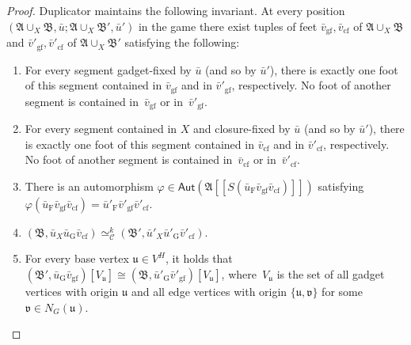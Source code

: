 \documentclass[]{lmcs}
\renewcommand{\phi}{\varphi}
\newcommand{\iso}{\cong}
\newcommand{\set}[1]{\lbrace #1 \rbrace}
\newcommand{\autoA}{\phi}
\newcommand{\autGroup}[1]{\mathsf{Aut}(#1)}
\newcommand{\tup}[1]{\bar{#1}}
\newcommand{\vertA}{u}
\newcommand{\vertB}{v}
\newcommand{\StructA}{\mathfrak{A}}
\newcommand{\StructB}{\mathfrak{B}}
\newcommand{\neighbors}[2]{N_{#1}(#2)}
\newcommand{\bVertA}{\mathfrak{u}}
\newcommand{\bVertB}{\mathfrak{v}}
\newcommand{\footbset}{X}
\newcommand{\footbsetA}{X}
\newcommand{\gluing}[3]{#1 \cup_#2 #3}
\newcommand{\kequiv}[1]{\simeq^#1_{\mathcal{C}}}
\newcommand{\footinduced}[2]{#1[[#2]]}
\newcommand{\segmentOf}[1]{S(#1)}
\newcommand{\feetrestrict}[2]{#1_{#2}}
\newcommand{\gadgetrestrict}[1]{#1_{\text{G}}}
\newcommand{\nongadgetrestrict}[1]{#1_{\text{F}}}
\newcommand{\gadgetfixed}[1]{#1_{\text{gf}}}
\newcommand{\closurefixed}[1]{#1_{\text{cf}}}
\begin{document}
\begin{proof}
	Duplicator maintains the following invariant.
	At every position $(\gluing{\StructA}{\footbset}{\StructB},\tup{\vertA} ; \gluing{\StructA}{\footbset}{\StructB'}, \tup{\vertA}')$ in the game
	there exist tuples of feet $\gadgetfixed{\tup{\vertB}}, \closurefixed{\tup{\vertB}}$
	of $\gluing{\StructA}{\footbset}{\StructB}$
	and $\gadgetfixed{\tup{\vertB}'},\closurefixed{\tup{\vertB}'}$
	of $\gluing{\StructA}{\footbset}{\StructB'}$ satisfying the following:
	\begin{enumerate}
		\item \label{itm:gadget-fixed-vertices}
		For every segment  gadget-fixed by $\tup{\vertA}$
		(and so by $\tup{\vertA}'$),
		there is exactly one foot of this segment contained in $\gadgetfixed{\tup{\vertB}}$ and in $\gadgetfixed{\tup{\vertB}'}$, respectively.
		No foot of another segment is contained in~$\gadgetfixed{\tup{\vertB}}$ or in~$\gadgetfixed{\tup{\vertB}'}$.
		\item \label{itm:closure-fixed-vertices}
		For every segment contained in $\footbsetA$ and closure-fixed by $\tup{\vertA}$ (and so by $\tup{\vertA}'$),
		there is exactly one foot of this segment contained in $\closurefixed{\tup{\vertB}}$ and in $\closurefixed{\tup{\vertB}'}$, respectively.
		No foot of another segment is contained in~$\closurefixed{\tup{\vertB}}$ or in~$\closurefixed{\tup{\vertB}'}$.
		\item \label{itm:inv-multipede} There is an automorphism $\autoA \in \autGroup{\footinduced{\StructA}{\segmentOf{\nongadgetrestrict{\tup{\vertA}}\gadgetfixed{\tup{\vertB}}\closurefixed{\tup{\vertB}}}}}$ satisfying
		$\autoA(\nongadgetrestrict{\tup{\vertA}}\gadgetfixed{\tup{\vertB}}\closurefixed{\tup{\vertB}}) = \nongadgetrestrict{\tup{\vertA}'}\gadgetfixed{\tup{\vertB}'}\closurefixed{\tup{\vertB}'}$.
		\item \label{itm:inv-cfi} $(\StructB, \feetrestrict{\tup{\vertA}}{\footbsetA}\gadgetrestrict{\tup{\vertA}}\closurefixed{\tup{\vertB}}) \kequiv{k} (\StructB', \feetrestrict{\tup{\vertA}'}{\footbsetA}\gadgetrestrict{\tup{\vertA}'}\closurefixed{\tup{\vertB}'})$.
		\item \label{itm:inv-cfi-gadget-fixed} For every base vertex $\bVertA \in V^H$,
		it holds that
		$(\StructB', \gadgetrestrict{\tup{\vertA}}\gadgetfixed{\tup{\vertB}})[V_\bVertA] \iso (\StructB, \gadgetrestrict{\tup{\vertA}'}\gadgetfixed{\tup{\vertB}'})[V_\bVertA]$,
		where~$V_\bVertA$ is the set of all gadget vertices with origin $\bVertA$ and all edge vertices with origin $\set{\bVertA,\bVertB}$ for some $\bVertB \in \neighbors{G}{\bVertA}$.

\end{enumerate}
\end{proof}
\end{document}

